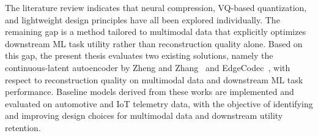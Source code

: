 The literature review indicates that neural compression, VQ-based quantization, and lightweight design principles have all been explored individually. The remaining gap is a method tailored to multimodal data that explicitly optimizes downstream ML task utility rather than reconstruction quality alone. Based on this gap, the present thesis evaluates two existing solutions, namely the continuous-latent autoencoder by Zheng and Zhang~\cite{Zheng2023} and EdgeCodec~\cite{Hodo2025}, with respect to reconstruction quality on multimodal data and downstream ML task performance. Baseline models derived from these works are implemented and evaluated on automotive and IoT telemetry data, with the objective of identifying and improving design choices for multimodal data and downstream utility retention.
